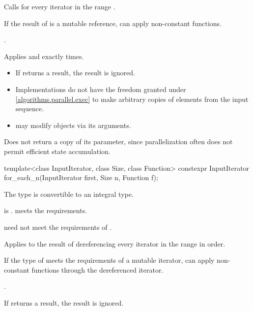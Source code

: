 \begin{itemdescr}
\pnum
\effects
Calls 
for every iterator 
in the range .
\begin{note}
If the result of  is a mutable reference,
 can apply non-constant functions.
\end{note}

\pnum
\returns
{}.

\pnum
\complexity
Applies  and  exactly  times.

\pnum
\remarks
\begin{itemize}
\item
  If  returns a result, the result is ignored.
\item
  Implementations do not have the freedom granted under \ref{algorithms.parallel.exec}
  to make arbitrary copies of elements from the input sequence.
\item
   may modify objects via its arguments.
\end{itemize}
\begin{note}
Does not return a copy of its  parameter,
since parallelization often does not permit
efficient state accumulation.
\end{note}
\end{itemdescr}

%
\begin{itemdecl}
template<class InputIterator, class Size, class Function>
  constexpr InputIterator for_each_n(InputIterator first, Size n, Function f);
\end{itemdecl}

\begin{itemdescr}
\pnum
\mandates
The type  is convertible
to an integral type.

\pnum
\expects
{} is .
 meets the  requirements.
\begin{note}
 need not meet
the requirements of .
\end{note}

\pnum
\effects
Applies  to the result of dereferencing
every iterator in the range  in order.
\begin{note}
If the type of  meets the requirements of a mutable iterator,
 can apply non-constant functions through the dereferenced iterator.
\end{note}

\pnum
\returns
{}.

\pnum
\remarks
If  returns a result, the result is ignored.
\end{itemdescr}

